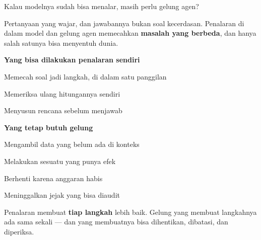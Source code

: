 \documentclass[aspectratio=169,11pt,t]{beamer}
\begin{document}
\begin{frame}[shrink=25]{Kalau modelnya sudah bisa menalar, masih perlu gelung agen?}
{\fontsize{9.4}{12.6}\selectfont\color{fg2}Pertanyaan yang wajar, dan jawabannya bukan soal kecerdasan. Penalaran di dalam model dan gelung agen memecahkan \textbf{masalah yang berbeda}, dan hanya salah satunya bisa menyentuh dunia.\par}\vskip 4pt
\begin{minipage}[t]{0.485\textwidth}
{\fontsize{9.4}{12.6}\selectfont\color{fg2}\textbf{Yang bisa dilakukan penalaran sendiri}\par}\vskip 4pt
\begin{ibullets}
\item Memecah soal jadi langkah, di dalam satu panggilan
\item Memeriksa ulang hitungannya sendiri
\item Menyusun rencana sebelum menjawab
\end{ibullets}

\end{minipage}%
\hfill
\begin{minipage}[t]{0.485\textwidth}
{\fontsize{9.4}{12.6}\selectfont\color{fg2}\textbf{Yang tetap butuh gelung}\par}\vskip 4pt
\begin{ibullets}
\item Mengambil data yang belum ada di konteks
\item Melakukan sesuatu yang punya efek
\item Berhenti karena anggaran habis
\item Meninggalkan jejak yang bisa diaudit
\end{ibullets}

\end{minipage}%
\begin{iband}[signal]
Penalaran membuat \textbf{tiap langkah} lebih baik. Gelung yang membuat langkahnya ada sama sekali --- dan yang membuatnya bisa dihentikan, dibatasi, dan diperiksa. 
\end{iband}
\end{frame}

\end{document}
